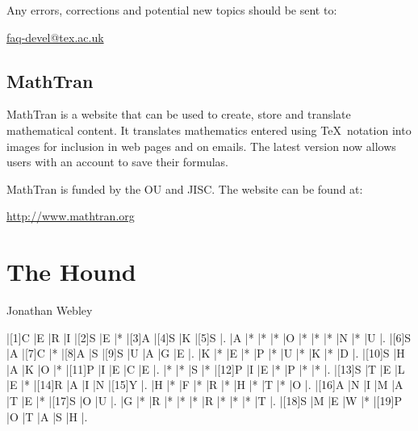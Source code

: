 \documentclass[a4paper,twoside,twocolumn]{article}
\newcommand{\AUTHOR}[1]
{
\textsf{#1} \vspace{1em}
}
\begin{document}
Any errors, corrections and potential new topics should be sent to:
\begin{center}
\href{mailto:faq-devel@tex.ac.uk}{faq-devel@tex.ac.uk}
\end{center}


\subsection{MathTran}

MathTran is a website that can be used to create, store and translate mathematical content. It translates mathematics entered using \TeX\ notation into images for inclusion in web pages and on emails. The latest version now allows users with an account to save their formulas.

MathTran is funded by the OU and JISC. The website can be found at:
\begin{center}
\href{http://www.mathtran.org/}{http://www.mathtran.org}
\end{center}



\section{The Hound}

\AUTHOR{Jonathan Webley}


\begin{Puzzle}{11}{11}
|[1]C |E |R |I |[2]S |E |* |[3]A |[4]S |K |[5]S |.
|A |* |* |* |O |* |* |* |N |* |U |.
|[6]S |A |[7]C |* |[8]A |S |[9]S |U |A |G |E |.
|K |* |E |* |P |* |U |* |K |* |D |.
|[10]S |H |A |K |O |* |[11]P |I |E |C |E |.
|* |* |S |* |[12]P |I |E |* |P |* |* |.
|[13]S |T |E |L |E |* |[14]R |A |I |N |[15]Y |.
|H |* |F |* |R |* |H |* |T |* |O |.
|[16]A |N |I |M |A |T |E |* |[17]S |O |U |.
|G |* |R |* |* |* |R |* |* |* |T |.
|[18]S |M |E |W |* |[19]P |O |T |A |S |H |.
\end{Puzzle}
\end{document}
